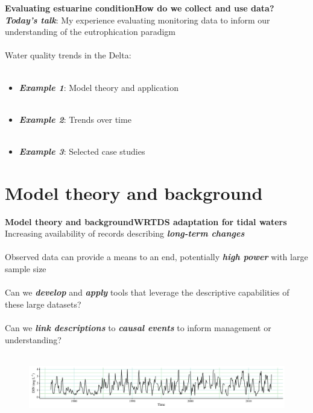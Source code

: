 \documentclass[serif]{beamer}\usepackage[]{graphicx}\usepackage[]{color}
\newcommand{\emtxt}[1]{\textbf{\textit{#1}}}
\begin{document}
\begin{frame}{\textbf{Evaluating estuarine condition}}{\textbf{How do we collect and use data?}}
\onslide<+->
\emtxt{Today's talk}: My experience evaluating monitoring data to inform our understanding of the eutrophication paradigm\\~\\
Water quality trends in the Delta: \\~\\
\begin{itemize}
\item \emtxt{Example 1}: Model theory and application \\~\\
\item \emtxt{Example 2}: Trends over time \\~\\
\item \emtxt{Example 3}: Selected case studies 
\end{itemize}
\end{frame}

\section{Model theory and background}



\begin{frame}{\textbf{Model theory and background}}{\textbf{WRTDS adaptation for tidal waters}}
Increasing availability of records describing \emtxt{long-term changes} \\~\\
Observed data can provide a means to an end, potentially \emtxt{high power} with large sample size \\~\\
Can we \emtxt{develop} and \emtxt{apply} tools that leverage the descriptive capabilities of these large datasets? \\~\\
Can we \emtxt{link descriptions} to \emtxt{causal events} to inform management or understanding? \\~\\
\begin{figure}
\centerline{\includegraphics[width = \textwidth]{fig/ts_ex.pdf}}
\end{figure}
\end{frame}
\end{document}
